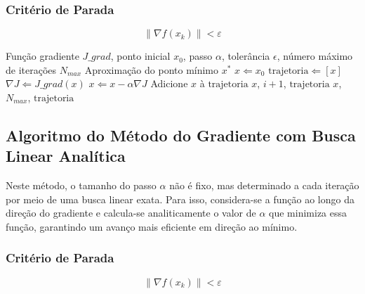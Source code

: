 \documentclass[runningheads]{llncs}
\begin{document}
\subsubsection{Critério de Parada}
\begin{equation}
    \left\| \nabla f(x_k) \right\| < \varepsilon
\end{equation}

\begin{algorithm}[H]
\caption{Método Gradiente}\label{alg:gradiente}
\begin{algorithmic}[1]
\Require Função gradiente $J\_grad$, ponto inicial $x_0$, passo $\alpha$, tolerância $\epsilon$, número máximo de iterações $N_{max}$
\Ensure Aproximação do ponto mínimo $x^*$
\State $x \Leftarrow x_0$
\State $\text{trajetoria} \Leftarrow [x]$
    \State $\nabla J \Leftarrow J\_grad(x)$
    \State $x \Leftarrow x - \alpha \nabla J$
    \State Adicione $x$ à $\text{trajetoria}$
        \State \Return $x$, $i+1$, $\text{trajetoria}$
    \EndIf
\EndFor
\State \Return $x$, $N_{max}$, $\text{trajetoria}$
\end{algorithmic}
\end{algorithm}

\subsection{Algoritmo do Método do Gradiente com Busca Linear Analítica}

Neste método, o tamanho do passo $\alpha$ não é fixo, mas determinado a cada iteração por meio de uma busca linear exata. Para isso, considera-se a função ao longo da direção do gradiente e calcula-se analiticamente o valor de $\alpha$ que minimiza essa função, garantindo um avanço mais eficiente em direção ao mínimo.


\subsubsection{Critério de Parada}
\begin{equation}
    \left\| \nabla f(x_k) \right\| < \varepsilon
\end{equation}
\end{document}
